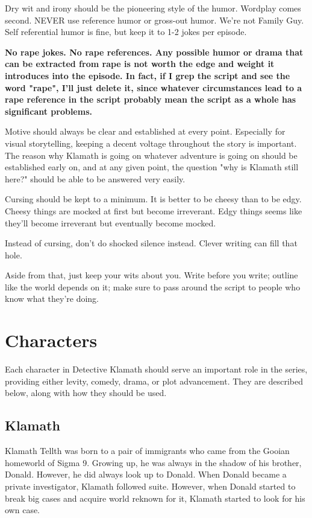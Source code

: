 \documentclass{article}
\begin{document}
Dry wit and irony should be the pioneering style of the humor. Wordplay comes second. NEVER use reference humor or gross-out humor. We're not Family Guy. Self referential humor is fine, but keep it to 1-2 jokes per episode.

\textbf{No rape jokes. No rape references. Any possible humor or drama that can be extracted from rape is not worth the edge and weight it introduces into the episode. In fact, if I grep the script and see the word "rape", I'll just delete it, since whatever circumstances lead to a rape reference in the script probably mean the script as a whole has significant problems.}

Motive should always be clear and established at every point. Especially for visual storytelling, keeping a decent voltage throughout the story is important. The reason why Klamath is going on whatever adventure is going on should be established early on, and at any given point, the question "why is Klamath still here?" should be able to be answered very easily.

Cursing should be kept to a minimum. It is better to be cheesy than to be edgy. Cheesy things are mocked at first but become irreverant. Edgy things seems like they'll become irreverant but eventually become mocked.

Instead of cursing, don't do shocked silence instead. Clever writing can fill that hole.

Aside from that, just keep your wits about you. Write before you write; outline like the world depends on it; make sure to pass around the script to people who know what they're doing.

\section{Characters}

Each character in Detective Klamath should serve an important role in the series, providing either levity, comedy, drama, or plot advancement. They are described below, along with how they should be used.

\subsection{Klamath}

Klamath Tellth was born to a pair of immigrants who came from the Gooian homeworld of Sigma 9. Growing up, he was always in the shadow of his brother, Donald. However, he did always look up to Donald. When Donald became a private investigator, Klamath followed suite. However, when Donald started to break big cases and acquire world reknown for it, Klamath started to look for his own case.
\end{document}
